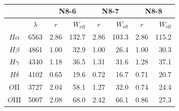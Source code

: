 \begin{table}
    \centering
    \caption{}
    \begin{tabular}{c c | c r | c r | c r }
        \hline \hline
         & & \multicolumn{2}{c|}{N8-6} & \multicolumn{2}{c|}{N8-7} & \multicolumn{2}{c}{N8-8} \\
        \hline
         & $\lambda$ & $r$ & $W_\text{eff}$ & $r$ & $W_\text{eff}$ & $r$ & $W_\text{eff}$ \\
        \hline
        $H\alpha$ & 6563 & 2.86 & 132.7 & 2.86 & 103.3 & 2.86 & 115.2 \\
        $H\beta$  & 4861 & 1.00 &  32.9 & 1.00 &  26.4 & 1.00 &  30.3 \\
        $H\gamma$ & 4340 & 1.18 &  36.5 & 1.31 &  31.6 & 1.28 &  37.1 \\
        $H\delta$ & 4102 & 0.65 &  19.6 & 0.72 &  16.7 & 0.71 &  20.7 \\
        $O$II     & 3727 & 2.04 &  58.1 & 1.27 &  32.0 & 0.74 &  24.4 \\
        $O$III    & 5007 & 2.08 &  68.0 & 2.42 &  66.1 & 0.86 &  27.3 \\

        \hline
    \end{tabular}
    \label{tab:lines}
\end{table}



